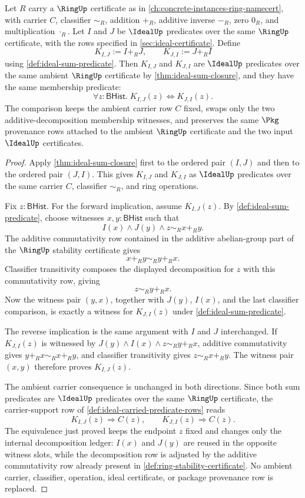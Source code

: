 \begin{theorem}
\label{thm:ideal-sum-commutativity}
Let $R$ carry a $\RingUp$ certificate as in \autoref{ch:concrete-instances-ring-namecert}, with carrier $C$, classifier $\sim_R$, addition $+_R$, additive inverse $-_R$, zero $0_R$, and multiplication $\cdot_R$. Let $I$ and $J$ be $\IdealUp$ predicates over the same $\RingUp$ certificate, with the rows specified in \autoref{sec:ideal-certificate}. Define
$$
K_{I,J}:=I+_RJ,
\qquad
K_{J,I}:=J+_RI
$$
using \autoref{def:ideal-sum-predicate}. Then $K_{I,J}$ and $K_{J,I}$ are $\IdealUp$ predicates over the same ambient $\RingUp$ certificate by \autoref{thm:ideal-sum-closure}, and they have the same membership predicate:
$$
\forall z:\mathsf{BHist}.\; K_{I,J}(z)\Longleftrightarrow K_{J,I}(z).
$$
The comparison keeps the ambient carrier row $C$ fixed, swaps only the two additive-decomposition membership witnesses, and preserves the same $\Pkg$ provenance rows attached to the ambient $\RingUp$ certificate and the two input $\IdealUp$ certificates.
\end{theorem}
\begin{proof}
Apply \autoref{thm:ideal-sum-closure} first to the ordered pair $(I,J)$ and then to the ordered pair $(J,I)$. This gives $K_{I,J}$ and $K_{J,I}$ as $\IdealUp$ predicates over the same carrier $C$, classifier $\sim_R$, and ring operations.

Fix $z:\mathsf{BHist}$. For the forward implication, assume $K_{I,J}(z)$. By \autoref{def:ideal-sum-predicate}, choose witnesses $x,y:\mathsf{BHist}$ such that
$$
I(x)\land J(y)\land z\sim_R x+_R y.
$$
The additive commutativity row contained in the additive abelian-group part of the $\RingUp$ stability certificate gives
$$
x+_R y\sim_R y+_R x.
$$
Classifier transitivity composes the displayed decomposition for $z$ with this commutativity row, giving
$$
z\sim_R y+_R x.
$$
Now the witness pair $(y,x)$, together with $J(y)$, $I(x)$, and the last classifier comparison, is exactly a witness for $K_{J,I}(z)$ under \autoref{def:ideal-sum-predicate}.

The reverse implication is the same argument with $I$ and $J$ interchanged. If $K_{J,I}(z)$ is witnessed by $J(y)\land I(x)\land z\sim_R y+_R x$, additive commutativity gives $y+_R x\sim_R x+_R y$, and classifier transitivity gives $z\sim_R x+_R y$. The witness pair $(x,y)$ therefore proves $K_{I,J}(z)$.

The ambient carrier consequence is unchanged in both directions. Since both sum predicates are $\IdealUp$ predicates over the same $\RingUp$ certificate, the carrier-support row of \autoref{def:ideal-carried-predicate-rows} reads
$$
K_{I,J}(z)\Longrightarrow C(z),
\qquad
K_{J,I}(z)\Longrightarrow C(z).
$$
The equivalence just proved keeps the endpoint $z$ fixed and changes only the internal decomposition ledger: $I(x)$ and $J(y)$ are reused in the opposite witness slots, while the decomposition row is adjusted by the additive commutativity row already present in \autoref{def:ring-stability-certificate}. No ambient carrier, classifier, operation, ideal certificate, or package provenance row is replaced.
\end{proof}

